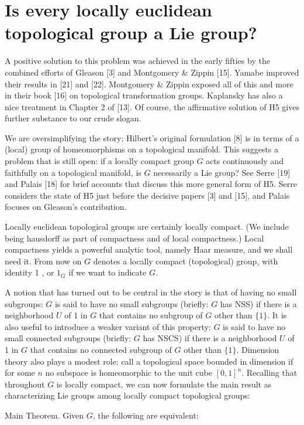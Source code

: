 \documentclass[10pt]{article}
\begin{document}
\section*{Is every locally euclidean topological group a Lie group?}
A positive solution to this problem was achieved in the early fifties by the combined efforts of Gleason [3] and Montgomery \& Zippin [15]. Yamabe improved their results in [21] and [22]. Montgomery \& Zippin exposed all of this and more in their book [16] on topological transformation groups. Kaplansky has also a nice treatment in Chapter 2 of [13]. Of course, the affirmative solution of H5 gives further substance to our crude slogan.

We are oversimplifying the story: Hilbert's original formulation [8] is in terms of a (local) group of homeomorphisms on a topological manifold. This suggests a problem that is still open: if a locally compact group $G$ acts continuously and faithfully on a topological manifold, is $G$ necessarily a Lie group? See Serre [19] and Palais [18] for brief accounts that discuss this more general form of H5. Serre considers the state of H5 just before the decisive papers [3] and [15], and Palais focuses on Gleason's contribution.

Locally euclidean topological groups are certainly locally compact. (We include being hausdorff as part of compactness and of local compactness.) Local compactness yields a powerful analytic tool, namely Haar measure, and we shall need it. From now on $G$ denotes a locally compact (topological) group, with identity 1 , or $1_{G}$ if we want to indicate $G$.

A notion that has turned out to be central in the story is that of having no small subgroups: $G$ is said to have no small subgroups (briefly: $G$ has NSS) if there is a neighborhood $U$ of 1 in $G$ that contains no subgroup of $G$ other than $\{1\}$. It is also useful to introduce a weaker variant of this property: $G$ is said to have no small connected subgroups (briefly: $G$ has NSCS) if there is a neighborhood $U$ of 1 in $G$ that contains no connected subgroup of $G$ other than $\{1\}$. Dimension theory also plays a modest role: call a topological space bounded in dimension if for some $n$ no subspace is homeomorphic to the unit cube $[0,1]^{n}$. Recalling that throughout $G$ is locally compact, we can now formulate the main result as characterizing Lie groups among locally compact topological groups:

Main Theorem. Given $G$, the following are equivalent:
\end{document}
